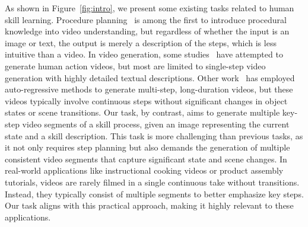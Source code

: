 As shown in Figure~\ref{fig:intro}, we present some existing tasks related to human skill learning. Procedure planning~\cite{DDN} is among the first to introduce procedural knowledge into video understanding, but regardless of whether the input is an image or text, the output is merely a description of the steps, which is less intuitive than a video. In video generation, some studies~\cite{SVD,aa,dynamicrafter,cogvideox} have attempted to generate human action videos, but most are limited to single-step video generation with highly detailed textual descriptions. Other work~\cite{pandora} has employed auto-regressive methods to generate multi-step, long-duration videos, but these videos typically involve continuous steps without significant changes in object states or scene transitions. Our task, by contrast, aims to generate multiple key-step video segments of a skill process, given an image representing the current state and a skill description. This task is more challenging than previous tasks, as it not only requires step planning but also demands the generation of multiple consistent video segments that capture significant state and scene changes. In real-world applications like instructional cooking videos or product assembly tutorials, videos are rarely filmed in a single continuous take without transitions. Instead, they typically consist of multiple segments to better emphasize key steps. Our task aligns with this practical approach, making it highly relevant to these applications.

